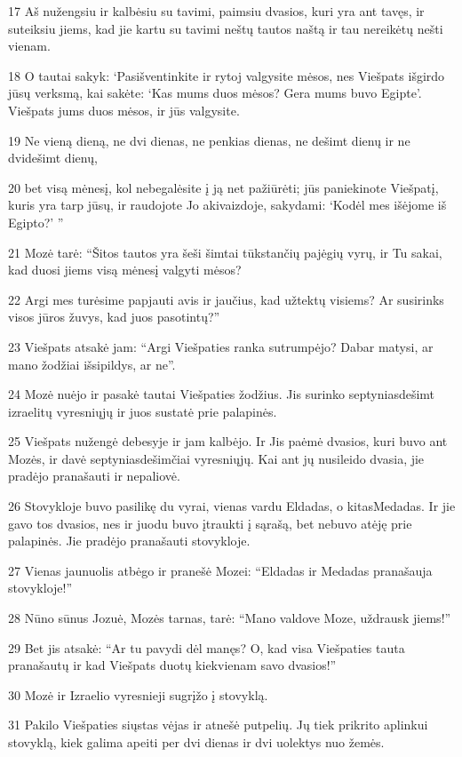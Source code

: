 \par 17 Aš nužengsiu ir kalbėsiu su tavimi, paimsiu dvasios, kuri yra ant tavęs, ir suteiksiu jiems, kad jie kartu su tavimi neštų tautos naštą ir tau nereikėtų nešti vienam. 
\par 18 O tautai sakyk: ‘Pasišventinkite ir rytoj valgysite mėsos, nes Viešpats išgirdo jūsų verksmą, kai sakėte: ‘Kas mums duos mėsos? Gera mums buvo Egipte’. Viešpats jums duos mėsos, ir jūs valgysite. 
\par 19 Ne vieną dieną, ne dvi dienas, ne penkias dienas, ne dešimt dienų ir ne dvidešimt dienų, 
\par 20 bet visą mėnesį, kol nebegalėsite į ją net pažiūrėti; jūs paniekinote Viešpatį, kuris yra tarp jūsų, ir raudojote Jo akivaizdoje, sakydami: ‘Kodėl mes išėjome iš Egipto?’ ” 
\par 21 Mozė tarė: “Šitos tautos yra šeši šimtai tūkstančių pajėgių vyrų, ir Tu sakai, kad duosi jiems visą mėnesį valgyti mėsos? 
\par 22 Argi mes turėsime papjauti avis ir jaučius, kad užtektų visiems? Ar susirinks visos jūros žuvys, kad juos pasotintų?” 
\par 23 Viešpats atsakė jam: “Argi Viešpaties ranka sutrumpėjo? Dabar matysi, ar mano žodžiai išsipildys, ar ne”. 
\par 24 Mozė nuėjo ir pasakė tautai Viešpaties žodžius. Jis surinko septyniasdešimt izraelitų vyresniųjų ir juos sustatė prie palapinės. 
\par 25 Viešpats nužengė debesyje ir jam kalbėjo. Ir Jis paėmė dvasios, kuri buvo ant Mozės, ir davė septyniasdešimčiai vyresniųjų. Kai ant jų nusileido dvasia, jie pradėjo pranašauti ir nepaliovė. 
\par 26 Stovykloje buvo pasilikę du vyrai, vienas vardu Eldadas, o kitas­Medadas. Ir jie gavo tos dvasios, nes ir juodu buvo įtraukti į sąrašą, bet nebuvo atėję prie palapinės. Jie pradėjo pranašauti stovykloje. 
\par 27 Vienas jaunuolis atbėgo ir pranešė Mozei: “Eldadas ir Medadas pranašauja stovykloje!” 
\par 28 Nūno sūnus Jozuė, Mozės tarnas, tarė: “Mano valdove Moze, uždrausk jiems!” 
\par 29 Bet jis atsakė: “Ar tu pavydi dėl manęs? O, kad visa Viešpaties tauta pranašautų ir kad Viešpats duotų kiekvienam savo dvasios!” 
\par 30 Mozė ir Izraelio vyresnieji sugrįžo į stovyklą. 
\par 31 Pakilo Viešpaties siųstas vėjas ir atnešė putpelių. Jų tiek prikrito aplinkui stovyklą, kiek galima apeiti per dvi dienas ir dvi uolektys nuo žemės. 
